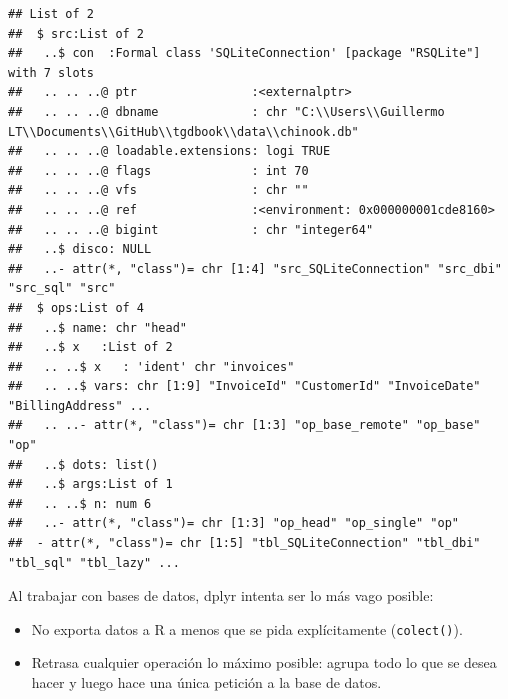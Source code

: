 \documentclass[
]{book}
\newenvironment{Shaded}{\begin{snugshade}}{\end{snugshade}}
\newcommand{\NormalTok}[1]{#1}
\newcommand{\OperatorTok}[1]{\textcolor[rgb]{0.81,0.36,0.00}{\textbf{#1}}}
\newcommand{\StringTok}[1]{\textcolor[rgb]{0.31,0.60,0.02}{#1}}
\begin{document}
\begin{verbatim}
## List of 2
##  $ src:List of 2
##   ..$ con  :Formal class 'SQLiteConnection' [package "RSQLite"] with 7 slots
##   .. .. ..@ ptr                :<externalptr> 
##   .. .. ..@ dbname             : chr "C:\\Users\\Guillermo LT\\Documents\\GitHub\\tgdbook\\data\\chinook.db"
##   .. .. ..@ loadable.extensions: logi TRUE
##   .. .. ..@ flags              : int 70
##   .. .. ..@ vfs                : chr ""
##   .. .. ..@ ref                :<environment: 0x000000001cde8160> 
##   .. .. ..@ bigint             : chr "integer64"
##   ..$ disco: NULL
##   ..- attr(*, "class")= chr [1:4] "src_SQLiteConnection" "src_dbi" "src_sql" "src"
##  $ ops:List of 4
##   ..$ name: chr "head"
##   ..$ x   :List of 2
##   .. ..$ x   : 'ident' chr "invoices"
##   .. ..$ vars: chr [1:9] "InvoiceId" "CustomerId" "InvoiceDate" "BillingAddress" ...
##   .. ..- attr(*, "class")= chr [1:3] "op_base_remote" "op_base" "op"
##   ..$ dots: list()
##   ..$ args:List of 1
##   .. ..$ n: num 6
##   ..- attr(*, "class")= chr [1:3] "op_head" "op_single" "op"
##  - attr(*, "class")= chr [1:5] "tbl_SQLiteConnection" "tbl_dbi" "tbl_sql" "tbl_lazy" ...
\end{verbatim}

Al trabajar con bases de datos, dplyr intenta ser lo más vago posible:

\begin{itemize}
\item
  No exporta datos a R a menos que se pida explícitamente (\texttt{colect()}).
\item
  Retrasa cualquier operación lo máximo posible:
  agrupa todo lo que se desea hacer y luego hace una única petición a la base de datos.
\end{itemize}

\begin{Shaded}
\end{Shaded}
\end{document}

